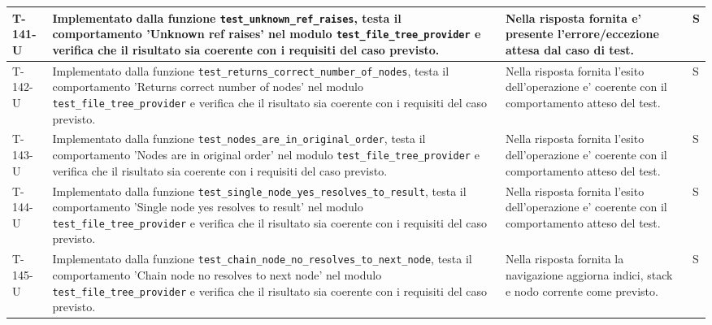 \documentclass[a4paper,12pt]{article}
\begin{document}
{{\begin{longtable}{|>{\RaggedRight\arraybackslash}p{1.55cm}|>{\RaggedRight\arraybackslash}p{8.0cm}|>{\RaggedRight\arraybackslash}p{4.6cm}|>{\RaggedRight\arraybackslash}p{1.2cm}|}
        \hline
        T-141-U & Implementato dalla funzione \texttt{test\_\allowbreak unknown\_\allowbreak ref\_\allowbreak raises}, testa il comportamento 'Unknown ref raises' nel modulo \texttt{test\_\allowbreak file\_\allowbreak tree\_\allowbreak provider} e verifica che il risultato sia coerente con i requisiti del caso previsto. & Nella risposta fornita e' presente l'errore/eccezione attesa dal caso di test. & S \\
        \hline
        T-142-U & Implementato dalla funzione \texttt{test\_\allowbreak returns\_\allowbreak correct\_\allowbreak number\_\allowbreak of\_\allowbreak nodes}, testa il comportamento 'Returns correct number of nodes' nel modulo \texttt{test\_\allowbreak file\_\allowbreak tree\_\allowbreak provider} e verifica che il risultato sia coerente con i requisiti del caso previsto. & Nella risposta fornita l'esito dell'operazione e' coerente con il comportamento atteso del test. & S \\
        \hline
        T-143-U & Implementato dalla funzione \texttt{test\_\allowbreak nodes\_\allowbreak are\_\allowbreak in\_\allowbreak original\_\allowbreak order}, testa il comportamento 'Nodes are in original order' nel modulo \texttt{test\_\allowbreak file\_\allowbreak tree\_\allowbreak provider} e verifica che il risultato sia coerente con i requisiti del caso previsto. & Nella risposta fornita l'esito dell'operazione e' coerente con il comportamento atteso del test. & S \\
        \hline
        T-144-U & Implementato dalla funzione \texttt{test\_\allowbreak single\_\allowbreak node\_\allowbreak yes\_\allowbreak resolves\_\allowbreak to\_\allowbreak result}, testa il comportamento 'Single node yes resolves to result' nel modulo \texttt{test\_\allowbreak file\_\allowbreak tree\_\allowbreak provider} e verifica che il risultato sia coerente con i requisiti del caso previsto. & Nella risposta fornita l'esito dell'operazione e' coerente con il comportamento atteso del test. & S \\
        \hline
        T-145-U & Implementato dalla funzione \texttt{test\_\allowbreak chain\_\allowbreak node\_\allowbreak no\_\allowbreak resolves\_\allowbreak to\_\allowbreak next\_\allowbreak node}, testa il comportamento 'Chain node no resolves to next node' nel modulo \texttt{test\_\allowbreak file\_\allowbreak tree\_\allowbreak provider} e verifica che il risultato sia coerente con i requisiti del caso previsto. & Nella risposta fornita la navigazione aggiorna indici, stack e nodo corrente come previsto. & S \\

\end{longtable}}}
\end{document}
